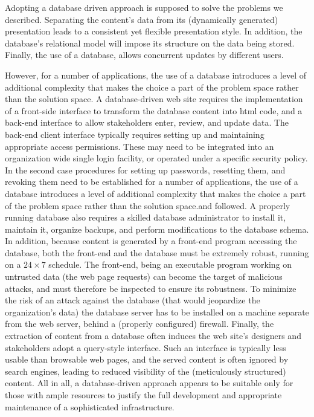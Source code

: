 \documentclass[10pt]{article}
\begin{document}
Adopting a database driven approach is supposed to
solve the problems we described.
Separating the content's data from its (dynamically generated)
presentation leads to a consistent
yet flexible presentation style.
In addition, the database's relational model will impose
its structure on the data being stored.
Finally, the use of a database, allows concurrent updates by
different users.

However, for a number of applications, the use of a database
introduces a level of additional complexity that
makes the choice a part of
the problem space rather than the solution space.
A database-driven web site requires the implementation of a
front-side interface to transform the database content into
{\sc html} code, and a back-end interface to allow stakeholders
enter, review, and update data.
The back-end client interface typically requires setting up
and maintaining appropriate access permissions.
These may need to be integrated into an organization wide single
login facility, or operated under a specific security policy.
In the second case procedures for setting up passwords,
resetting them, and revoking them need to be established
 for a number of applications, the use of a database
introduces a level of additional complexity that
makes the choice a part of
the problem space rather than the solution space.and followed.
A properly running database also requires a skilled database
administrator to install it, maintain it, organize backups,
and perform modifications to the database schema.
In addition, because content is generated by a front-end
program accessing the database, both the front-end and the database
must be extremely robust, running on a $24 \times 7$ schedule.
The front-end, being an executable program working on
untrusted data (the web page requests) can become the target of
malicious attacks,
and must therefore be inspected to ensure its robustness.
To minimize the risk of an attack against the database
(that would jeopardize the organization's data)
the database server has to be installed on a machine separate
from the web server, behind a (properly configured) firewall.
Finally, the extraction of content from a database often
induces the web site's designers and stakeholders adopt a
query-style interface.
Such an interface is typically less usable than browsable web pages,
and the served content is often ignored by search engines,
leading to reduced visibility
of the (meticulously structured) content.
All in all, a database-driven approach appears to be suitable
only for those with ample resources to justify the full
development and appropriate maintenance of a sophisticated infrastructure.
\end{document}

